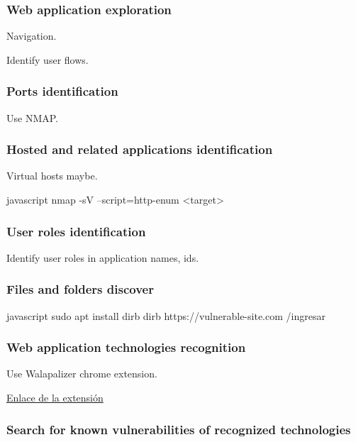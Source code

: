 \documentclass[letterpaper,12pt]{extarticle}
\begin{document}
\subsubsection{Web application exploration}

Navigation.

Identify user flows.

\subsubsection{Ports identification}

Use NMAP.


\subsubsection{Hosted and related applications identification}

Virtual hosts maybe.

\begin{sourcecode}{javascript}
nmap -sV --script=http-enum <target>
\end{sourcecode}

\subsubsection{User roles identification}

Identify user roles in application names, ids.

\subsubsection{Files and folders discover}

\begin{sourcecode}{javascript}
sudo apt install dirb
dirb https://vulnerable-site.com /ingresar
\end{sourcecode}

\subsubsection{Web application technologies recognition}

Use Walapalizer chrome extension.

\href{https://chrome.google.com/webstore/detail/wappalyzer-technology-pro/gppongmhjkpfnbhagpmjfkannfbllamg}{Enlace de la extensión}


\subsubsection{Search for known vulnerabilities of recognized technologies}
\end{document}
